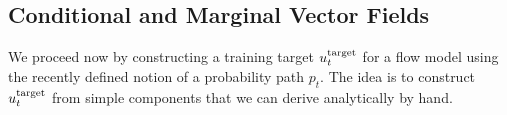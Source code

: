 


\subsection{Conditional and Marginal Vector Fields}

We proceed now by constructing a training target $u^{\text{target}}_t$ for a flow model using the recently defined notion of a probability path $p_t$. The idea is to construct $u^{\text{target}}_t$ from simple components that we can derive analytically by hand.

